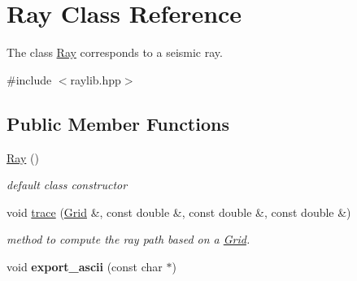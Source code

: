 \hypertarget{class_ray}{}\section{Ray Class Reference}
\label{class_ray}


The class \hyperlink{class_ray}{Ray} corresponds to a seismic ray.  




{\ttfamily \#include $<$raylib.\+hpp$>$}

\subsection*{Public Member Functions}
\begin{DoxyCompactItemize}
\item 
\hypertarget{class_ray_a2e3d2c29f2df4ab3da10da79d4acb852}{}\hyperlink{class_ray_a2e3d2c29f2df4ab3da10da79d4acb852}{Ray} ()\label{class_ray_a2e3d2c29f2df4ab3da10da79d4acb852}

\begin{DoxyCompactList}\small\item\em default class constructor \end{DoxyCompactList}\item 
void \hyperlink{class_ray_ae0467e19b3cf83467dab708af0f8d5d6}{trace} (\hyperlink{class_grid}{Grid} \&, const double \&, const double \&, const double \&)
\begin{DoxyCompactList}\small\item\em method to compute the ray path based on a \hyperlink{class_grid}{Grid}. \end{DoxyCompactList}\item 
\hypertarget{class_ray_a59e61537ef33667eff39eaf62da7d0f5}{}void {\bfseries export\+\_\+ascii} (const char $\ast$)\label{class_ray_a59e61537ef33667eff39eaf62da7d0f5}


\end{DoxyCompactItemize}
